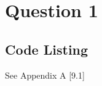 \newpage
\section{Question 1}
	
	
	\subsection{}	%

		
	\subsection{}	%

	\subsection{}	%

		
		\subsection*{Code Listing}
			See Appendix A [9.1]
